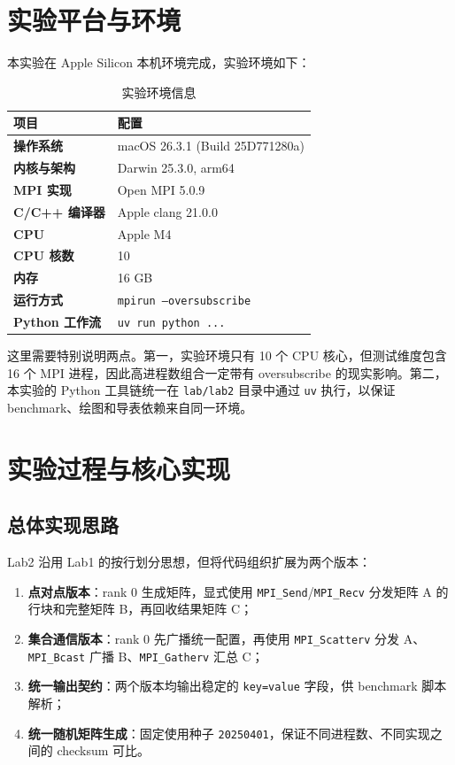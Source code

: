 \documentclass[UTF8,a4paper,12pt,fontset=none]{ctexart}
\begin{document}
\section{实验平台与环境}

本实验在 Apple Silicon 本机环境完成，实验环境如下：

\begin{table}[H]
  \centering
  \caption{实验环境信息}
  \renewcommand{\arraystretch}{1.2}
  \begin{tabularx}{0.92\textwidth}{>{\bfseries}p{4cm}X}
    \toprule
    项目 & 配置 \\
    \midrule
    操作系统 & macOS 26.3.1 (Build 25D771280a) \\
    内核与架构 & Darwin 25.3.0, arm64 \\
    MPI 实现 & Open MPI 5.0.9 \\
    C/C++ 编译器 & Apple clang 21.0.0 \\
    CPU & Apple M4 \\
    CPU 核数 & 10 \\
    内存 & 16 GB \\
    运行方式 & \texttt{mpirun --oversubscribe} \\
    Python 工作流 & \texttt{uv run python ...} \\
    \bottomrule
  \end{tabularx}
\end{table}

这里需要特别说明两点。第一，实验环境只有 10 个 CPU 核心，但测试维度包含 16 个 MPI 进程，因此高进程数组合一定带有 oversubscribe 的现实影响。第二，本实验的 Python 工具链统一在 \texttt{lab/lab2} 目录中通过 \texttt{uv} 执行，以保证 benchmark、绘图和导表依赖来自同一环境。

\section{实验过程与核心实现}

\subsection{总体实现思路}

Lab2 沿用 Lab1 的按行划分思想，但将代码组织扩展为两个版本：

\begin{enumerate}[leftmargin=2.2em]
  \item \textbf{点对点版本}：rank 0 生成矩阵，显式使用 \texttt{MPI\_Send}/\texttt{MPI\_Recv} 分发矩阵 A 的行块和完整矩阵 B，再回收结果矩阵 C；
  \item \textbf{集合通信版本}：rank 0 先广播统一配置，再使用 \texttt{MPI\_Scatterv} 分发 A、\texttt{MPI\_Bcast} 广播 B、\texttt{MPI\_Gatherv} 汇总 C；
  \item \textbf{统一输出契约}：两个版本均输出稳定的 \texttt{key=value} 字段，供 benchmark 脚本解析；
  \item \textbf{统一随机矩阵生成}：固定使用种子 \texttt{20250401}，保证不同进程数、不同实现之间的 checksum 可比。
\end{enumerate}
\end{document}

